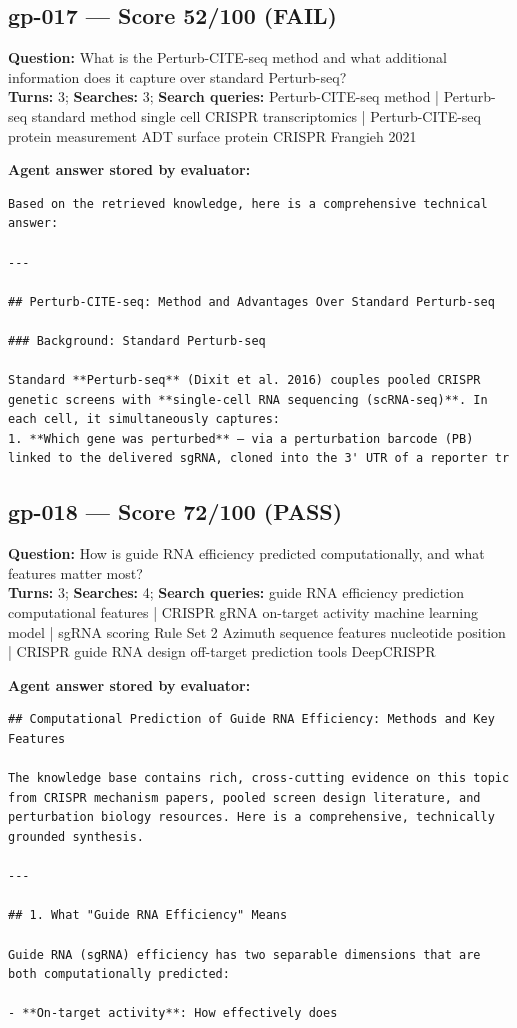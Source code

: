 \documentclass[12pt, a4paper]{article}
\begin{document}
\subsection*{gp-017 --- Score 52/100 (FAIL)}
\noindent\textbf{Question:} What is the Perturb-CITE-seq method and what additional information does it capture over standard Perturb-seq?\\
\textbf{Turns:} 3; \textbf{Searches:} 3; \textbf{Search queries:} Perturb-CITE-seq method | Perturb-seq standard method single cell CRISPR transcriptomics | Perturb-CITE-seq protein measurement ADT surface protein CRISPR Frangieh 2021

\noindent\textbf{Agent answer stored by evaluator:}
\begin{lstlisting}[numbers=none]
Based on the retrieved knowledge, here is a comprehensive technical answer:

---

## Perturb-CITE-seq: Method and Advantages Over Standard Perturb-seq

### Background: Standard Perturb-seq

Standard **Perturb-seq** (Dixit et al. 2016) couples pooled CRISPR genetic screens with **single-cell RNA sequencing (scRNA-seq)**. In each cell, it simultaneously captures:
1. **Which gene was perturbed** — via a perturbation barcode (PB) linked to the delivered sgRNA, cloned into the 3' UTR of a reporter tr
\end{lstlisting}

\subsection*{gp-018 --- Score 72/100 (PASS)}
\noindent\textbf{Question:} How is guide RNA efficiency predicted computationally, and what features matter most?\\
\textbf{Turns:} 3; \textbf{Searches:} 4; \textbf{Search queries:} guide RNA efficiency prediction computational features | CRISPR gRNA on-target activity machine learning model | sgRNA scoring Rule Set 2 Azimuth sequence features nucleotide position | CRISPR guide RNA design off-target prediction tools DeepCRISPR

\noindent\textbf{Agent answer stored by evaluator:}
\begin{lstlisting}[numbers=none]
## Computational Prediction of Guide RNA Efficiency: Methods and Key Features

The knowledge base contains rich, cross-cutting evidence on this topic from CRISPR mechanism papers, pooled screen design literature, and perturbation biology resources. Here is a comprehensive, technically grounded synthesis.

---

## 1. What "Guide RNA Efficiency" Means

Guide RNA (sgRNA) efficiency has two separable dimensions that are both computationally predicted:

- **On-target activity**: How effectively does 
\end{lstlisting}
\end{document}
